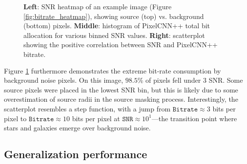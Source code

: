 \begin{figure}[ht]
\begin{minipage}{.74\textwidth}
        \end{minipage}
    \caption{
    \textbf{Left}: SNR heatmap of an example image (Figure \ref{fig:bitrate_heatmap}), showing source (top) vs. background (bottom) pixels. \textbf{Middle}: histogram of PixelCNN++ total bit allocation for various binned SNR values. \textbf{Right}: scatterplot showing the positive correlation between SNR and PixelCNN++ bitrate.
    }
    \label{fig:bit_allocation}
    \vspace{-1em}
\end{figure}

Figure \ref{fig:bit_allocation} furthermore demonstrates the extreme bit-rate consumption by background noise pixels. On this image, $98.5$\% of pixels fell under $3$ SNR. Some source pixels were placed in the lowest SNR bin, but this is likely due to some overestimation of source radii in the source masking process. Interestingly, the scatterplot resembles a step function, with a jump from $\texttt{Bitrate} \approx 3$ bits per pixel to $\texttt{Bitrate} \approx 10$ bits per pixel at $\texttt{SNR} \approx 10^{1}$—the transition point where stars and galaxies emerge over background noise.


\subsection{Generalization performance}\label{sec:generalization}

